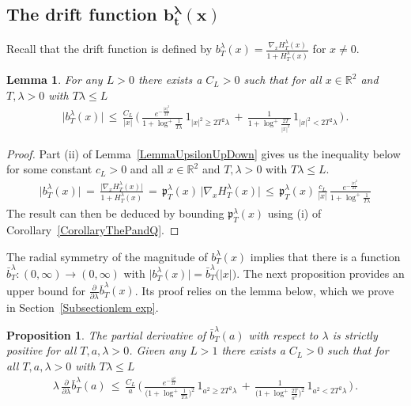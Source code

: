 \documentclass[10pt]{article}
\numberwithin{equation}{section}
\newtheorem{lemma}[theorem]{Lemma}
\newtheorem{proposition}[theorem]{Proposition}
\theoremstyle{definition}
\newcommand{\R}{{\mathbb R}}
\begin{document}
\subsection{The drift function $\boldsymbol{b_{t}^{\lambda}(x)}$  } \label{SubsecDriftFunc}
Recall that the drift function  is defined by $ b_{T}^{\lambda}(x)=\frac{ \nabla_x H_T^{\lambda}(x)  }{  1+ H^{\lambda}_T(x) } $ for $x\neq 0$.
\begin{lemma} \label{LemDrift}
For any $L>0$ there exists a $C_L>0$ such that for all $x\in \R^2$ and $T,\lambda >0$ with $T\lambda \leq L$
\begin{align*} 
\big| b_{T}^{\lambda}(x)\big| \, \leq  \,\frac{C_L }{ |x| } \,\Bigg(\, \frac{e^{- \frac{|x|^2}{2T} } }{ 1 +\log^+\frac{1}{T\lambda}}\,  1_{ |x|^2 \geq 2T^2\lambda  }  \,+\,\frac{1}{1+ \log^+\frac{2T}{|x|^2}   }\, 1_{|x|^2  <   2T^2 \lambda   } \,\Bigg)\,.
\end{align*}
\end{lemma}
\begin{proof} Part (ii) of Lemma~\ref{LemmaUpsilonUpDown} gives us the inequality below for some constant $c_L>0$ and all $x\in \R^2$ and $T,\lambda>0$ with $T\lambda \leq L$.
\begin{align*}
  \big|b_{T}^{\lambda}(x)\big|\,=\, \frac{ \big|\nabla_x H_T^{\lambda}(x) \big| }{ 1+ H^{\lambda}_T(x) }  \,=\, \mathfrak{p}_T^{\lambda}(x)\, \big|\nabla_x H_T^{\lambda}(x) \big|  \, \leq \, \mathfrak{p}_T^{\lambda}(x)\,\frac{ c_L }{ |x| } \,\frac{e^{- \frac{|x|^2}{2T} }  }{ 1+\log^+\frac{1}{ T\lambda} }  
\end{align*}
The result can then be deduced by bounding  $\mathfrak{p}_T^{\lambda}(x)$ using (i) of Corollary~\ref{CorollaryThePandQ}.
\end{proof}


The radial symmetry of the magnitude of $b_{T}^{\lambda}(x)$ implies that  there is a function $\bar{b}_{T}^{\lambda}:(0,\infty)\rightarrow (0,\infty)$ with $\big|b_{T}^{\lambda}(x)\big|=\bar{b}_{T}^{\lambda}\big(|x|\big)$.  The next proposition provides an upper bound for  $\frac{\partial}{\partial \lambda}\overline{b}_{T}^{\lambda}(x)$. Its proof relies  
on the  lemma below, which we prove in Section~\ref{Subsectionlem exp}.
\begin{proposition}\label{PropBulkForDrift} The partial derivative of $\bar{b}_{T}^{\lambda}(a) $ with respect to $\lambda$ is strictly positive for all $T,a,\lambda>0$.  Given any $L>1$ there exists a $C_L>0$ such that for all  $T,a,\lambda >0$ with $T\lambda \leq L$
\begin{align*}
 \lambda\,\frac{\partial}{\partial \lambda}\bar{b}_{T}^{\lambda}(a) \,\leq \,  \frac{C_L}{a} \,\Bigg( \,\frac{  e^{-\frac{a^2}{2T}}}{\big(1+\log^+\frac{1}{T\lambda }\big)^2    }\, 1_{a^2\geq 2T^2\lambda  }\,+\,  \frac{  1}{\big(1+\log^+\frac{  2T }{ a^2 }\big)^2    }\, 1_{a^2 < 2T^2\lambda  }   \,\Bigg) \,.
\end{align*}
\end{proposition}
\end{document}
